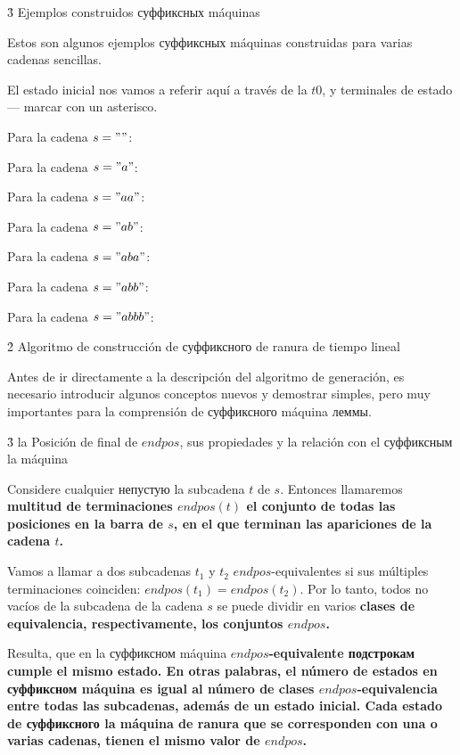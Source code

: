 \h3{ Ejemplos construidos суффиксных máquinas }

Estos son algunos ejemplos суффиксных máquinas construidas para varias cadenas sencillas.

El estado inicial nos vamos a referir aquí a través de la $t0$, y terminales de estado --- marcar con un asterisco.

Para la cadena $s = ""$:


Para la cadena $s = "a"$:


Para la cadena $s = "aa"$:


Para la cadena $s = "ab"$:


Para la cadena $s = "aba"$:


Para la cadena $s = "abb"$:


Para la cadena $s = "abbb"$:




\h2{ Algoritmo de construcción de суффиксного de ranura de tiempo lineal }

Antes de ir directamente a la descripción del algoritmo de generación, es necesario introducir algunos conceptos nuevos y demostrar simples, pero muy importantes para la comprensión de суффиксного máquina леммы.


\h3{ la Posición de final de $endpos$, sus propiedades y la relación con el суффиксным la máquina }

Considere cualquier непустую la subcadena $t$ de $s$. Entonces llamaremos \bf{multitud de terminaciones} $endpos(t)$ el conjunto de todas las posiciones en la barra de $s$, en el que terminan las apariciones de la cadena $t$.

Vamos a llamar a dos subcadenas $t_1$ y $t_2$ $endpos$-equivalentes si sus múltiples terminaciones coinciden: $endpos(t_1) = endpos(t_2)$. Por lo tanto, todos no vacíos de la subcadena de la cadena $s$ se puede dividir en varios \bf{clases de equivalencia}, respectivamente, los conjuntos $endpos$.

Resulta, que en la суффиксном máquina \bf{$endpos$-equivalente подстрокам cumple el mismo estado}. En otras palabras, el número de estados en суффиксном máquina es igual al número de clases $endpos$-equivalencia entre todas las subcadenas, además de un estado inicial. Cada estado de суффиксного la máquina de ranura que se corresponden con una o varias cadenas, tienen el mismo valor de $endpos$.

